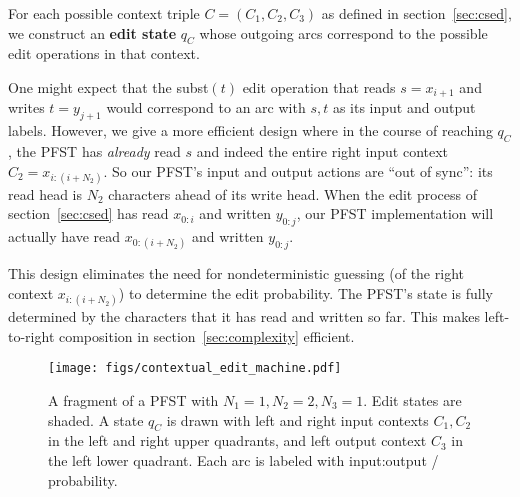 \documentclass[11pt,letterpaper]{article}
\newcommand{\Sigmay}{\Sigma_{\text y}}
\newcommand{\ptheta}{{p_\theta}}
\newcommand{\SkipForSpace}[1]{}
\begin{document}
For each possible context triple $C = (C_1, C_2, C_3)$ as defined in
section~\ref{sec:csed}, we construct an {\bf edit state} $q_C$ whose
outgoing arcs correspond to the possible edit operations in that
context.  

One might expect that the {\sc subst}$(t)$ edit operation that reads
$s=x_{i+1}$ and writes $t=y_{j+1}$ would correspond to an arc with
$s,t$ as its input and output labels.  However, we give a more
efficient design where in the course of reaching $q_C$, the PFST has
{\em already} read $s$ and indeed the entire right input context
$C_2=x_{i:(i+N_2)}$.  So our PFST's input and output actions are ``out
of sync'': its read head is $N_2$ characters ahead of its write head.
When the edit process of section~\ref{sec:csed} has read $x_{0:i}$ and
written $y_{0:j}$, our PFST implementation will actually have read
$x_{0:(i+N_2)}$ and written $y_{0:j}$.

This design eliminates the need for nondeterministic guessing (of the right context $x_{i:(i+N_2)}$) to determine the edit probability.  The PFST's state is fully determined by the characters that it has read and written so far\SkipForSpace{: it is deterministic when regarded as a joint acceptor of $x$ and $y$}.  This makes left-to-right composition in section~\ref{sec:complexity} efficient.%
\SkipForSpace{\footnote{\label{fn:nondet} A similar design is used to {\em deterministically} convert phones to triphones in speech recognition \cite{mohri2002weighted}. The alternative would be for the FST to have read only $x_{0:i}$ when entering $q_C$.  Then $C_2$ would be a nondeterministic guess of the right input context, with which future input arcs must be consistent.  While this design would keep the read and write heads in sync so that $x_{i+1}$ was read at the same time $y_{j+1}$ was written, it would result in a far more nondeterministic FST, which could be in any of $O(|\Sigmay|^{N_2})$ different states (corresponding to different guesses of the string $C_2$) given the characters it had read and written so far.  This nondeterminism would slow down the compositions in section~\ref{sec:complexity} that compute $\ptheta(y\mid x)$ or the most likely edit sequence given $x$.  (Also, this alternative design would not satisfy section~\ref{sec:pfst}'s formal PFST definition, although it would define the same distribution $\ptheta(y\mid x)$.)}}

\begin{figure} \centering
  \texttt{[image: figs/contextual\_edit\_machine.pdf]}
  \caption{\label{fig:edit_distance}A fragment of a PFST with $N_1=1, N_2=2, N_3=1$.  
    Edit states are shaded.  A state $q_C$ is drawn with left and right input contexts $C_1,C_2$ in the left and right upper quadrants, and left output context $C_3$ in the left lower quadrant.  Each arc is labeled with input:output / probability. 
%
  }
\end{figure}
\end{document}
